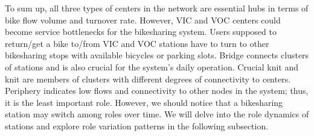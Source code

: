 \documentclass[a4paper,fleqn]{cas-sc}
\begin{document}
To sum up, all three types of centers in the network are essential hubs in terms of bike flow volume and turnover rate. However, VIC and VOC centers could become service bottlenecks for the bikesharing system. Users supposed to return/get a bike to/from VIC and VOC stations have to turn to other bikesharing stops with available bicycles or parking slots. Bridge connects clusters of stations and is also crucial for the system's daily operation. Crucial knit and knit are members of clusters with different degrees of connectivity to centers. Periphery indicates low flows and connectivity to other nodes in the system; thus, it is the least important role. However, we should notice that a bikesharing station may switch among roles over time. We will delve into the role dynamics of stations and explore role variation patterns in the following subsection.
\end{document}
